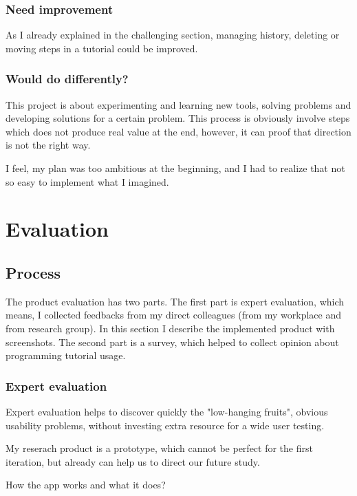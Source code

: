 \documentclass[12pt, a4paper, oneside, openright, medskipamount]{report}
\begin{document}
\subsection {Need improvement}

As I already explained in the challenging section, managing history, deleting or moving steps in a tutorial could be improved.

\subsection {Would do differently?}

This project is about experimenting and learning new tools, solving problems and developing solutions for a certain problem. This process is obviously involve steps which does not produce real value at the end, however, it can proof that direction is not the right way.

I feel, my plan was too ambitious at the beginning, and I had to realize that not so easy to implement what I imagined.

\chapter{Evaluation}

\section{Process}

The product evaluation has two parts. The first part is expert evaluation, which means, I collected feedbacks from my direct colleagues (from my workplace and from research group). In this section I describe the implemented product with screenshots. The second part is a survey, which helped to collect opinion about programming tutorial usage.

\subsection{Expert evaluation}

Expert evaluation helps to discover quickly the "low-hanging fruits", obvious usability problems, without investing extra resource for a wide user testing.

My reserach product is a prototype, which cannot be perfect for the first iteration, but already can help us to direct our future study.

How the app works and what it does?
\end{document}
